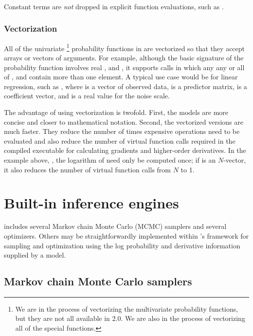 \documentclass[article]{jss}
\begin{document}
Constant terms are {\it not} dropped in explicit function evaluations,
such as .

\subsubsection{Vectorization}

All of the univariate%
%
\footnote{We are in the process of vectorizing the multivariate
  probability functions, but they are not all available in
   2.0.  We are also in the process of vectorizing
  all of the special functions.}
%
probability functions in  are vectorized so that they
accept arrays or vectors of arguments.  For example, although the
basic signature of the probability function
 involves real ,  and
, it supports calls in which any any or all of ,
 and  contain more than one element. A typical
use case would be for linear regression, such as , where  is a vector of observed data,
 is a predictor matrix,  is a coefficient vector,
and  is a real value for the noise scale.

The advantage of using vectorization is twofold.  First, the models
are more concise and closer to mathematical notation.  Second, the
vectorized versions are much faster.  They reduce the number of times
expensive operations need to be evaluated and also reduce the number
of virtual function calls required in the compiled 
executable for calculating gradients and higher-order derivatives.
In the example above, , the logarithm of  need only be computed
once; if  is an $N$-vector, it also reduces the number of
virtual function calls from $N$ to 1.

\section{Built-in inference engines}\label{inference-engines.section}

 includes several Markov chain Monte Carlo (MCMC)
samplers and several optimizers.  Others may be straightforwardly
implemented within 's  framework for
sampling and optimization using the log probability and derivative
information supplied by a model.

\subsection{Markov chain Monte Carlo samplers}
\end{document}
